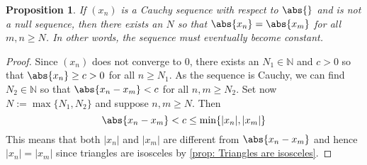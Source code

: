\documentclass{article}
\newtheorem{proposition}{Proposition}[section]
\newcommand{\mbb}[1]{\mathbb{#1}}
\numberwithin{equation}{section}
\begin{document}
\begin{proposition}\label{prop: Non-archimedian absolute value has constant tail}
	If $(x_n)$ is a Cauchy sequence with respect to $\abs{}$ and is not a null sequence, then there exists an $N$ so that $\abs{x_n} = \abs{x_m}$ for all $m,n \geq N$. In other words, the sequence must eventually become constant.
\end{proposition}
\begin{proof}
	Since $(x_n)$ does not converge to 0, there exists an $N_1 \in \mbb N$ and $c > 0$ so that $\abs{x_n} \geq c > 0$ for all $n \geq N_1$. As the sequence is Cauchy, we can find $N_2 \in \mbb N$ so that $\abs{x_n - x_m} < c$ for all $n,m \geq N_2$. Set now $N := \max \{N_1, N_2\}$ and suppose $n,m \geq N$. Then
	$$\abs{x_n - x_m} <  c \leq \min\{|x_n|, |x_m|\}$$
	This means that both $|x_n|$ and $|x_m|$ are different from $\abs{x_n - x_m}$ and hence $|x_n| = |x_m|$ since triangles are isosceles by \cref{prop: Triangles are isosceles}.
\end{proof}
\end{document}
